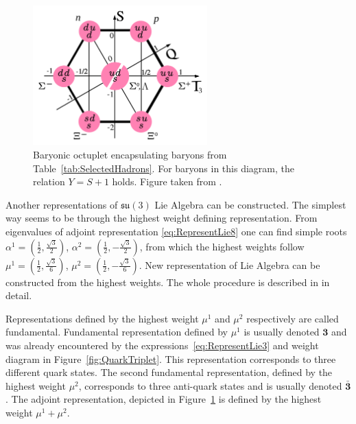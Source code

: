 \begin{figure}[t]
  \centering
  \includegraphics[width=0.6\textwidth]{Chapter1/Baryon-octet.png} 
  \caption[Baryonic octuplet encapsulating baryons from
          Table~\ref{tab:SelectedHadrons}. For baryons in this diagram, the relation $Y
          = S + 1$ holds.]
          {Baryonic octuplet encapsulating baryons from
          Table~\ref{tab:SelectedHadrons}. For baryons in this diagram, the
          relation $Y = S + 1$ holds. Figure taken from \cite{wiki:EightFoldWay}.}
  \label{fig:BaryonicOctet}
\end{figure}

Another representations of $\mathfrak{su}(3)$ Lie Algebra can be constructed.
The simplest way seems to be through the highest weight defining representation.
From eigenvalues of adjoint representation \eqref{eq:RepresentLie8} one can find
simple roots 
$\alpha^1=\left( \frac{1}{2}, \frac{\sqrt{3}}{2} \right)$, 
$\alpha^2=\left( \frac{1}{2}, - \frac{\sqrt{3}}{2} \right)$, 
from which the highest weights follow
$\mu^1=\left( \frac{1}{2}, \frac{\sqrt{3}}{6} \right)$, 
$\mu^2=\left( \frac{1}{2}, - \frac{\sqrt{3}}{6} \right)$. 
New representation of Lie Algebra can be constructed from the highest weights.
The whole procedure is described in \cite{LieAlgebrasForParticlePhysicists} in
detail.

Representations defined by the highest weight $\mu^1$ and $\mu^2$ respectively are
called fundamental. Fundamental representation defined by $\mu^1$ is usually
denoted $\mathbf{3}$ and was already encountered by the
expressions~\eqref{eq:RepresentLie3} and weight diagram in
Figure~\ref{fig:QuarkTriplet}. This representation corresponds to three
different quark states.  
The second fundamental representation, defined by the highest weight $\mu^2$,
corresponds to three anti-quark states and is usually denoted
$\bar{\mathbf{3}}$. 
The adjoint representation, depicted in Figure~\ref{fig:BaryonicOctet} is
defined by the highest weight $\mu^1 + \mu^2$.

